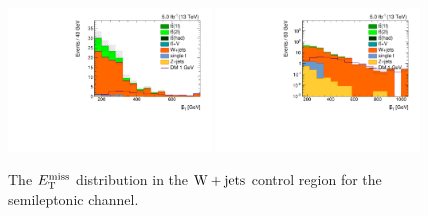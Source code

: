 \begin{figure}[htbp]
  \centering
  \includegraphics[width=0.48\textwidth]{figures/semilept-incl-0b-met_l.pdf}
  \includegraphics[width=0.48\textwidth]{figures/semilept-incl-0b-metlog_l.pdf}
  \caption{The $E_\mathrm{T}^{\mathrm{miss}}$ distribution in the $\mathrm{W+jets}$ control region for the semileptonic channel.}
  \label{fig:incl_semilept_0b_met}
\end{figure}
